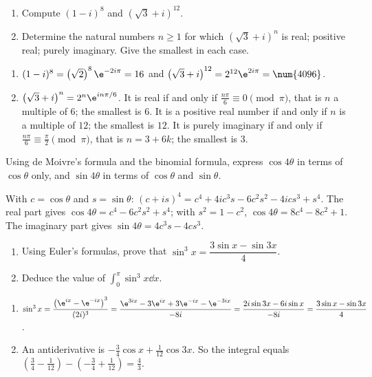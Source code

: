 \begin{exercise}[Powers]
\begin{enumerate}
\item Compute $(1-i)^8$ and $\left(\sqrt3+i\right)^{12}$.
\item Determine the natural numbers $n\ge1$ for which $\left(\sqrt3+i\right)^n$ is real; positive real; purely imaginary. Give the smallest in each case.
\end{enumerate}
\end{exercise}
\begin{solution}
\begin{enumerate}
\item $(1-i)^8=\left(\sqrt2\right)^8\e^{-2i\pi}=16$ and $\left(\sqrt3+i\right)^{12}=2^{12}\e^{2i\pi}=\num{4096}$.
\item $\left(\sqrt3+i\right)^n=2^n\e^{in\pi/6}$. It is real if and only if $\frac{n\pi}6\equiv0\pmod\pi$, that is $n$ a multiple of $6$; the smallest is $6$. It is a positive real number if and only if $n$ is a multiple of $12$; the smallest is $12$. It is purely imaginary if and only if $\frac{n\pi}6\equiv\frac\pi2\pmod\pi$, that is $n=3+6k$; the smallest is $3$.
\end{enumerate}
\end{solution}

\begin{exercise}
Using de Moivre's formula and the binomial formula, express $\cos4\theta$ in terms of $\cos\theta$ only, and $\sin4\theta$ in terms of $\cos\theta$ and $\sin\theta$.
\end{exercise}
\begin{solution}
With $c=\cos\theta$ and $s=\sin\theta$: $(c+is)^4=c^4+4ic^3s-6c^2s^2-4ics^3+s^4$. The real part gives $\cos4\theta=c^4-6c^2s^2+s^4$; with $s^2=1-c^2$, $\cos4\theta=8c^4-8c^2+1$. The imaginary part gives $\sin4\theta=4c^3s-4cs^3$.
\end{solution}

\begin{exercise}
\begin{enumerate}
\item Using Euler's formulas, prove that $\sin^3x=\dfrac{3\sin x-\sin3x}4$.
\item Deduce the value of $\displaystyle\int_0^\pi\sin^3x\dd x$.
\end{enumerate}
\end{exercise}
\begin{solution}
\begin{enumerate}
\item $\sin^3x=\dfrac{\left(\e^{ix}-\e^{-ix}\right)^3}{(2i)^3}=\dfrac{\e^{3ix}-3\e^{ix}+3\e^{-ix}-\e^{-3ix}}{-8i}=\dfrac{2i\sin3x-6i\sin x}{-8i}=\dfrac{3\sin x-\sin3x}4$.
\item An antiderivative is $-\frac34\cos x+\frac1{12}\cos3x$. So the integral equals $\left(\frac34-\frac1{12}\right)-\left(-\frac34+\frac1{12}\right)=\frac43$.
\end{enumerate}
\end{solution}

